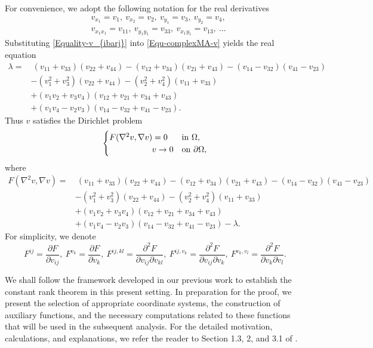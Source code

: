 \documentclass[11pt]{amsart}
\numberwithin{theorem}{section}
\numberwithin{equation}{section}
\begin{document}
For convenience, we adopt the following notation for the real derivatives
\begin{align*}
&v_{x_1}=v_1, \ v_{x_2}=v_2, \ v_{y_1}=v_3, \ v_{y_2}=v_4, \\
&v_{x_1x_1}=v_{11}, \ v_{y_1y_1}=v_{33}, \ v_{x_1y_1}=v_{13}, \ \ldots
\end{align*}
Substituting \eqref{Equality-v_{ibarj}} into \eqref{Equ-complexMA-v} yields the real equation
\begin{equation}\label{Equation-real equation(v)}
\begin{aligned}
\lambda
=&~(v_{11}+v_{33})(v_{22}+v_{44})-(v_{12}+v_{34})(v_{21}+v_{43})-(v_{14}-v_{32})(v_{41}-v_{23})\\
&-(v_1^2+v_3^2)(v_{22}+v_{44})-(v_2^2+v_4^2)(v_{11}+v_{33})\\
&+(v_1v_2+v_3v_4)(v_{12}+v_{21}+v_{34}+v_{43})\\
&+(v_1v_4-v_2v_3)(v_{14}-v_{32}+v_{41}-v_{23}). \end{aligned}
\end{equation}
Thus $v$ satisfies the Dirichlet problem
\begin{equation}\label{Equation-Dirichlet problem-real}
\begin{cases}
F(\nabla^2v,\nabla v)=0 & \mathrm{in}\ \Omega,\\
\hspace{18mm} v\rightarrow 0 & \mathrm{on}\ \partial\Omega,
\end{cases}
\end{equation}
where
\begin{align*}
F(\nabla^2v,\nabla v)
=&~(v_{11}+v_{33})(v_{22}+v_{44})-(v_{12}+v_{34})(v_{21}+v_{43})-(v_{14}-v_{32})(v_{41}-v_{23})\\
&-(v_1^2+v_3^2)(v_{22}+v_{44})-(v_2^2+v_4^2)(v_{11}+v_{33})\\
&+(v_1v_2+v_3v_4)(v_{12}+v_{21}+v_{34}+v_{43})\\
&+(v_1v_4-v_2v_3)(v_{14}-v_{32}+v_{41}-v_{23})-\lambda.
\end{align*}
For simplicity, we denote $$F^{ij}=\frac{\partial F}{\partial v_{ij}},\ F^{v_k}=\frac{\partial F}{\partial v_k},\ F^{ij,kl}=\frac{\partial^2F}{\partial v_{ij}\partial v_{kl}},\ F^{ij,v_k}=\frac{\partial^2F}{\partial v_{ij}\partial v_k},\ F^{v_k,v_l}=\frac{\partial^2F}{\partial v_k\partial v_l}.$$

We shall follow the framework developed in our previous work \cite{Zhang-Zhou2025} to establish the constant rank theorem in this present setting. In preparation for the proof, we present the selection of appropriate coordinate systems, the construction of auxiliary functions, and the necessary computations related to these functions that will be used in the subsequent analysis. For the detailed motivation, calculations, and explanations, we refer the reader to Section 1.3, 2, and 3.1 of \cite{Zhang-Zhou2025}.
\end{document}
